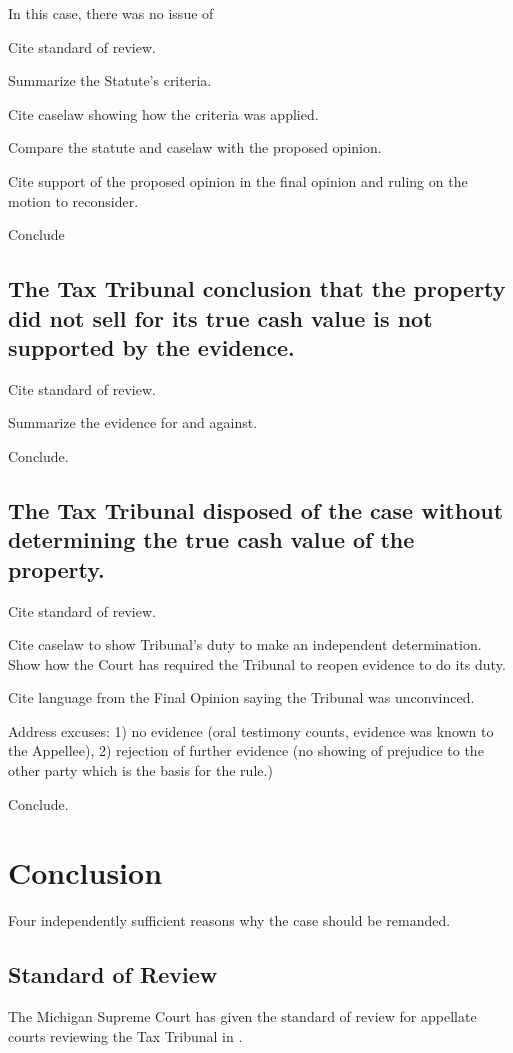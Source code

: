 \documentclass[12pt,\documentclassflag]{michiganCourtOfAppealsBrief}
\begin{document}
In this case, there was no issue of 

Cite standard of review.

Summarize the Statute's criteria.

Cite caselaw showing how the criteria was applied.

Compare the statute and caselaw with the proposed opinion.

Cite support of the proposed opinion in the final opinion and ruling on the motion to reconsider.

Conclude
\subsection{The Tax Tribunal conclusion that the property did not sell for its true cash value is not supported by the evidence.}
Cite standard of review.

Summarize the evidence for and against.

Conclude.
\subsection{The Tax Tribunal disposed of the case without determining the true cash value of the property.}
Cite standard of review.

Cite caselaw to show Tribunal's duty to make an independent determination.
Show how the Court has required the Tribunal to reopen evidence to do its duty.

Cite language from the Final Opinion saying the Tribunal was unconvinced.

Address excuses: 1) no evidence (oral testimony counts, evidence was known to the Appellee), 2) rejection of further evidence (no showing of prejudice to the other party which is the basis for the rule.)

Conclude.


\section{Conclusion}

Four independently sufficient reasons why the case should be remanded.


\subsection{Standard of Review}
 
The Michigan Supreme Court has given the standard of review for appellate courts reviewing the Tax Tribunal in .
\end{document}
